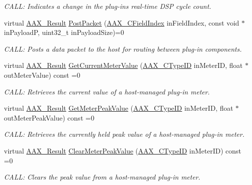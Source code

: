 \begin{DoxyCompactItemize}
\begin{DoxyCompactList}\small\item\em C\+A\+L\+L\+: Indicates a change in the plug-\/in\textquotesingle{}s real-\/time D\+S\+P cycle count. \end{DoxyCompactList}\item 
virtual \hyperlink{a00149_a4d8f69a697df7f70c3a8e9b8ee130d2f}{A\+A\+X\+\_\+\+Result} \hyperlink{a00053_a5bb3178980788c00cc2fe17729b5bf7b}{Post\+Packet} (\hyperlink{a00149_ae807f8986143820cfb5d6da32165c9c7}{A\+A\+X\+\_\+\+C\+Field\+Index} in\+Field\+Index, const void $\ast$in\+Payload\+P, uint32\+\_\+t in\+Payload\+Size)=0
\begin{DoxyCompactList}\small\item\em C\+A\+L\+L\+: Posts a data packet to the host for routing between plug-\/in components. \end{DoxyCompactList}\item 
virtual \hyperlink{a00149_a4d8f69a697df7f70c3a8e9b8ee130d2f}{A\+A\+X\+\_\+\+Result} \hyperlink{a00053_a2010fae8eb08f24156ae2fc4a3698c9a}{Get\+Current\+Meter\+Value} (\hyperlink{a00149_ac678f9c1fbcc26315d209f71a147a175}{A\+A\+X\+\_\+\+C\+Type\+I\+D} in\+Meter\+I\+D, float $\ast$out\+Meter\+Value) const =0
\begin{DoxyCompactList}\small\item\em C\+A\+L\+L\+: Retrieves the current value of a host-\/managed plug-\/in meter. \end{DoxyCompactList}\item 
virtual \hyperlink{a00149_a4d8f69a697df7f70c3a8e9b8ee130d2f}{A\+A\+X\+\_\+\+Result} \hyperlink{a00053_aec42969d56720ac54290250bc45f89fb}{Get\+Meter\+Peak\+Value} (\hyperlink{a00149_ac678f9c1fbcc26315d209f71a147a175}{A\+A\+X\+\_\+\+C\+Type\+I\+D} in\+Meter\+I\+D, float $\ast$out\+Meter\+Peak\+Value) const =0
\begin{DoxyCompactList}\small\item\em C\+A\+L\+L\+: Retrieves the currently held peak value of a host-\/managed plug-\/in meter. \end{DoxyCompactList}\item 
virtual \hyperlink{a00149_a4d8f69a697df7f70c3a8e9b8ee130d2f}{A\+A\+X\+\_\+\+Result} \hyperlink{a00053_ae2bc5026d16796a8cb4294f1805302bc}{Clear\+Meter\+Peak\+Value} (\hyperlink{a00149_ac678f9c1fbcc26315d209f71a147a175}{A\+A\+X\+\_\+\+C\+Type\+I\+D} in\+Meter\+I\+D) const =0
\begin{DoxyCompactList}\small\item\em C\+A\+L\+L\+: Clears the peak value from a host-\/managed plug-\/in meter. \end{DoxyCompactList}\item 

\end{DoxyCompactItemize}
